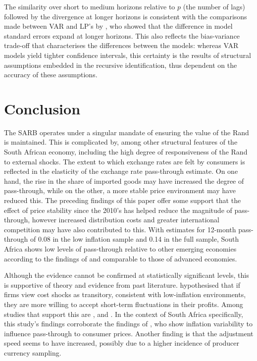 \documentclass[12pt]{article}
\begin{document}
The similarity over short to medium horizons relative to $p$ (the number of lags) followed by the divergence at longer horizons is consistent with the comparisons made between VAR and LP's by \textcite{montielolea2025lp}, who showed that the difference in model standard errors expand at longer horizons. This also reflects the bias-variance trade-off that characterises the differences between the models: whereas VAR models yield tighter confidence intervals, this certainty is the results of structural assumptions embedded in the recursive identification, thus dependent on the accuracy of these assumptions. 

\pagebreak

\section{Conclusion}

The SARB operates under a singular mandate of ensuring the value of the Rand is maintained. This is complicated by, among other structural features of the South African economy, including  the high degree of responsiveness of the Rand to external shocks. The extent to which exchange rates are felt by consumers is reflected in the elasticity of the exchange rate pass-through estimate. On one hand, the rise in the share of imported goods may have increased the degree of pass-through, while on the other, a more stable price environment may have reduced this. The preceding findings of this paper offer some support that the effect of price stability since the 2010's has helped reduce the magnitude of pass-through, however increased distribution costs and greater international competition may have also contributed to this. With estimates for 12-month pass-through of  0.08 in the low inflation sample and 0.14 in the full sample, South Africa shows low levels of pass-through relative to other emerging economies according to the findings of \textcite{cazorzi2007} and comparable to those of advanced economies. 

Although the evidence cannot be confirmed at statistically significant levels, this is supportive of theory and evidence from past literature. \textcite{taylor2000low} hypothesised that if firms view cost shocks as transitory, consistent with low-inflation environments, they are more willing to accept short-term fluctuations in their profits. Among studies that support this are \textcite{gagnon2004monetary}, \textcite{stulz2007} and \textcite{ozkan2015time}. In the context of South Africa specifically, this study's findings corroborate the findings of \textcite{jooste2014determinants}, who show inflation variability to influence pass-through to consumer prices. Another finding is that the adjustment speed seems to have increased, possibly due to a higher incidence of producer currency sampling. 
\end{document}
